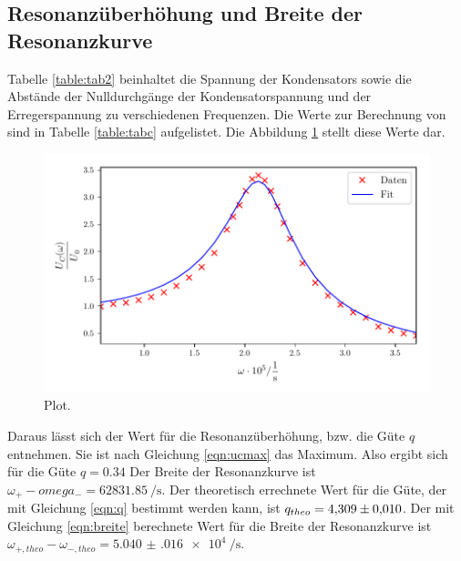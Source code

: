 \subsection{Resonanzüberhöhung und Breite der Resonanzkurve}
Tabelle \ref{table:tab2} beinhaltet die Spannung der Kondensators
sowie die Abstände der Nulldurchgänge der Kondensatorspannung
und der Erregerspannung zu verschiedenen Frequenzen.
Die Werte zur Berechnung von %
sind in Tabelle \ref{table:tabc} aufgelistet.
Die Abbildung \ref{fig:plotc} stellt diese Werte dar.


\begin{figure}
  \centering
  \includegraphics{build/plotc.pdf}
  \caption{Plot.}
  \label{fig:plotc}
\end{figure}
\noindent Daraus lässt sich der Wert für die Resonanzüberhöhung, bzw. die Güte $q$ entnehmen.
Sie ist nach Gleichung \eqref{eqn:ucmax} das Maximum.
Also ergibt sich für die Güte $q = \num{0.34}$
Der Breite der Resonanzkurve ist
$\omega_{+} - omega_{-} = \SI[per-mode=fraction]{62831.85}{\per\second}$. %
\newline
Der theoretisch errechnete Wert für die Güte, der mit Gleichung
\eqref{eqn:q} bestimmt werden kann, ist $q_{theo} = \num{4.309 \pm.010}$.
Der mit Gleichung \eqref{eqn:breite} berechnete Wert für die Breite der
Resonanzkurve ist
$\omega_{+,theo} - \omega_{-,theo} = \SI[per-mode=fraction]{5.040(016)e4}{\per\second}$.

